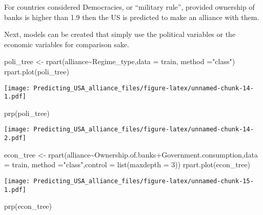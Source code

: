 \documentclass[
]{article}
\newenvironment{Shaded}{\begin{snugshade}}{\end{snugshade}}
\newcommand{\AttributeTok}[1]{\textcolor[rgb]{0.77,0.63,0.00}{#1}}
\newcommand{\DecValTok}[1]{\textcolor[rgb]{0.00,0.00,0.81}{#1}}
\newcommand{\FunctionTok}[1]{\textcolor[rgb]{0.00,0.00,0.00}{#1}}
\newcommand{\NormalTok}[1]{#1}
\newcommand{\OtherTok}[1]{\textcolor[rgb]{0.56,0.35,0.01}{#1}}
\newcommand{\SpecialCharTok}[1]{\textcolor[rgb]{0.00,0.00,0.00}{#1}}
\newcommand{\StringTok}[1]{\textcolor[rgb]{0.31,0.60,0.02}{#1}}
\begin{document}
For countries considered Democracies, or ``military rule'', provided
ownership of banks is higher than 1.9 then the US is predicted to make
an alliance with them.

Next, models can be created that simply use the political variables or
the economic variables for comparison sake.

\begin{Shaded}
\begin{Highlighting}[]
\NormalTok{poli\_tree }\OtherTok{\textless{}{-}} \FunctionTok{rpart}\NormalTok{(alliance}\SpecialCharTok{\textasciitilde{}}\NormalTok{Regime\_type,}\AttributeTok{data =}\NormalTok{ train, }\AttributeTok{method =}\StringTok{"class"}\NormalTok{)}
\FunctionTok{rpart.plot}\NormalTok{(poli\_tree)}
\end{Highlighting}
\end{Shaded}

\texttt{[image: Predicting\_USA\_alliance\_files/figure-latex/unnamed-chunk-14-1.pdf]}

\begin{Shaded}
\begin{Highlighting}[]
\FunctionTok{prp}\NormalTok{(poli\_tree)}
\end{Highlighting}
\end{Shaded}

\texttt{[image: Predicting\_USA\_alliance\_files/figure-latex/unnamed-chunk-14-2.pdf]}

\begin{Shaded}
\begin{Highlighting}[]
\NormalTok{econ\_tree }\OtherTok{\textless{}{-}} \FunctionTok{rpart}\NormalTok{(alliance}\SpecialCharTok{\textasciitilde{}}\NormalTok{Ownership.of.banks}\SpecialCharTok{+}\NormalTok{Government.consumption,}\AttributeTok{data =}\NormalTok{ train, }\AttributeTok{method =}\StringTok{"class"}\NormalTok{,}\AttributeTok{control =} \FunctionTok{list}\NormalTok{(}\AttributeTok{maxdepth =} \DecValTok{3}\NormalTok{))}
\FunctionTok{rpart.plot}\NormalTok{(econ\_tree)}
\end{Highlighting}
\end{Shaded}

\texttt{[image: Predicting\_USA\_alliance\_files/figure-latex/unnamed-chunk-15-1.pdf]}

\begin{Shaded}
\begin{Highlighting}[]
\FunctionTok{prp}\NormalTok{(econ\_tree)}
\end{Highlighting}
\end{Shaded}
\end{document}
